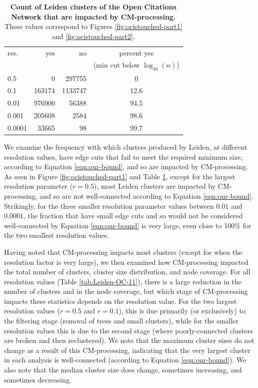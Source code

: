 \documentclass[11pt]{article}   	%
\begin{document}
\begin{table}[ht]
\centering
\begin{tabular}{lrrc}
  \hline
 res. & yes & no & percent yes  \\
 & & & (min cut below $\log_{10}(n)$) \\
  \hline
  0.5 & 0 & 297755 & 0 \\ 
   0.1 & 163174 & 1133747 & 12.6  \\ 
    0.01 & 976900 & 56388 & 94.5\\ 
    0.001 & 205608 & 2584 & 98.6 \\ 
   0.0001 & 33665 &  98 & 99.7 \\ 
   \hline
\end{tabular}
\caption{\textbf{Count of Leiden clusters of the Open Citations Network that are  impacted by CM-processing.}     These values correspond to Figures \ref{fig:ocistouched-part1} and \ref{fig:ocistouched-part2}.} %
\label{tab:ocistouched-part1}
\end{table}


We examine the frequency with which clusters produced by Leiden, at different resolution values, have edge cuts that fail to meet the required minimum size, according to Equation \ref{eqn:our-bound}, and so are  impacted by CM-processing. 
As seen in Figure \ref{fig:ocistouched-part1} and Table \ref{tab:ocistouched-part1}, except for the largest resolution parameter ($r=0.5$), most Leiden clusters are impacted by CM-processing, and so are not well-connected according to Equation \ref{eqn:our-bound}.
Strikingly, for the three smaller resolution parameter values between $0.01$ and $0.0001$, the fraction that have small edge cuts and so would not be considered well-connected by Equation \ref{eqn:our-bound} is very large, even close to 100\% for the two smallest resolution values.


Having noted that CM-processing impacts most clusters (except for when the resolution factor is very large), we then examined how CM-processing impacted the total number of clusters, cluster size distribution, and node coverage. 
For all resolution values (Table \ref{tab:Leiden-OC-11}), there is a large reduction in the number of clusters and in the node coverage, but which stage of CM-processing impacts these statistics depends on the resolution value.
For the  two largest resolution values ($r=0.5$ and $r=0.1$), this is
due primarily (or exclusively) to the filtering stage (removal of trees and small clusters), 
while  for the smaller resolution values this is due to the second stage (where poorly-connected clusters are broken and then reclustered).
We note that the maximum cluster sizes do not change as a result of this CM-processing, indicating that the very largest cluster in each analysis is well-connected (according to Equation \ref{eqn:our-bound}).
We also note that the median cluster size does change, sometimes increasing,  and sometimes decreasing.
\end{document}
